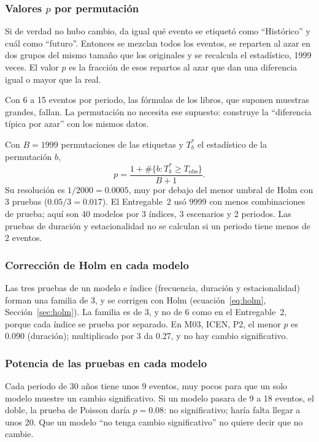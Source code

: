 \documentclass[11pt,a4paper]{article}
\begin{document}
\subsubsection{Valores $p$ por permutación}
\label{sec:permutaciones}

Si de verdad no hubo cambio, da igual qué evento se etiquetó como ``Histórico'' y cuál como ``futuro''.
Entonces se mezclan todos los eventos, se reparten al azar en dos grupos del mismo tamaño que los originales y se recalcula el estadístico, 1999 veces.
El valor $p$ es la fracción de esos repartos al azar que dan una diferencia igual o mayor que la real.

Con 6 a 15 eventos por periodo, las fórmulas de los libros, que suponen muestras grandes, fallan.
La permutación no necesita ese supuesto: construye la ``diferencia típica por azar'' con los mismos datos.

Con $B = 1999$ permutaciones de las etiquetas y $T^{*}_b$ el estadístico de la permutación $b$,
\begin{equation}
\label{eq:perm}
p = \frac{1 + \#\{b : T^{*}_b \ge T_{\mathrm{obs}}\}}{B + 1}.
\end{equation}
Su resolución es $1/2000 = 0.0005$, muy por debajo del menor umbral de Holm con 3 pruebas ($0.05/3 = 0.017$).
El Entregable~2 usó 9999 con menos combinaciones de prueba; aquí son 40 modelos por 3 índices, 3 escenarios y 2 periodos.
Las pruebas de duración y estacionalidad no se calculan si un periodo tiene menos de 2 eventos.

\subsubsection{Corrección de Holm en cada modelo}

Las tres pruebas de un modelo e índice (frecuencia, duración y estacionalidad) forman una familia de 3, y se corrigen con Holm (ecuación~\eqref{eq:holm}, Sección~\ref{sec:holm}).
La familia es de 3, y no de 6 como en el Entregable~2, porque cada índice se prueba por separado.
En M03, ICEN, P2, el menor $p$ es 0.090 (duración); multiplicado por 3 da 0.27, y no hay cambio significativo.

\subsubsection{Potencia de las pruebas en cada modelo}
\label{sec:a_potencia}

Cada periodo de 30 años tiene unos 9 eventos, muy pocos para que un solo modelo muestre un cambio significativo.
Si un modelo pasara de 9 a 18 eventos, el doble, la prueba de Poisson daría $p = 0.08$: no significativo; haría falta llegar a unos 20.
Que un modelo ``no tenga cambio significativo'' no quiere decir que no cambie.
\end{document}
